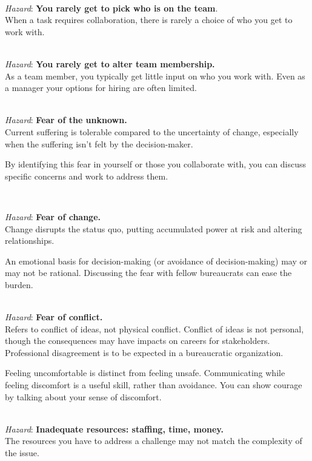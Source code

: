 \ \\
\textit{Hazard}: \textbf{You rarely get to pick who is on the team}. \\
When a task requires collaboration, there is rarely a choice of who you get to work with. 

\ \\
\textit{Hazard}: \textbf{You rarely get to alter team membership.}\\
As a team member, you typically get little input on who you work with. Even as a manager your options for hiring are often limited. 

\ \\
\textit{Hazard}: \textbf{Fear of the unknown.}\\
Current suffering is tolerable compared to the uncertainty of change, especially when the suffering isn't felt by the decision-maker.

By identifying this fear in yourself or those you collaborate with, you can discuss specific concerns and work to address them.

\ \\
\begin{samepage}
\textit{Hazard}: \textbf{Fear of change.} \\
Change disrupts the status quo, putting accumulated power at risk and altering relationships. 
\end{samepage}

An emotional basis for decision-making (or avoidance of decision-making) may or may not be rational. Discussing the fear with fellow bureaucrats can ease the burden. 

\ \\
\textit{Hazard}: \textbf{Fear of conflict.}\\
Refers to conflict of ideas, not physical conflict. Conflict of ideas is not personal, though the consequences may have impacts on careers for stakeholders. \\
Professional disagreement is to be expected in a bureaucratic organization.

Feeling uncomfortable is distinct from feeling unsafe. Communicating while feeling discomfort is a useful skill, rather than avoidance. You can show courage by talking about your sense of discomfort. 

\ \\
\textit{Hazard}: \textbf{Inadequate resources: staffing, time, money.}\\
The resources you have to address a challenge may not match the complexity of the issue.

